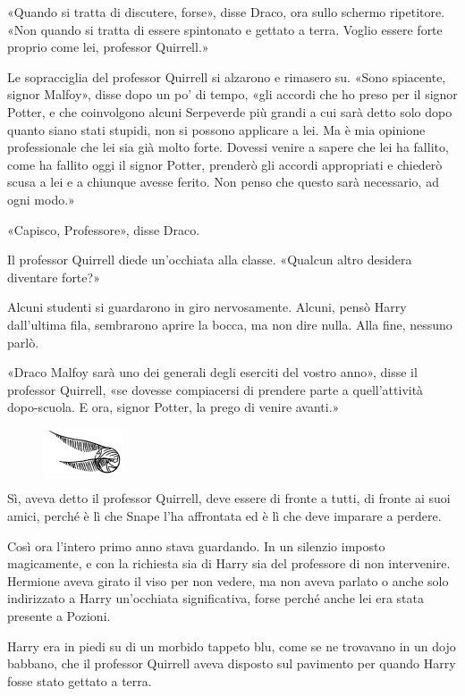 «Quando si tratta di discutere, forse», disse Draco, ora sullo schermo ripetitore. «Non quando si tratta di essere spintonato e gettato a terra. Voglio essere forte proprio come lei, professor Quirrell.»

Le sopracciglia del professor Quirrell si alzarono e rimasero su. «Sono spiacente, signor Malfoy», disse dopo un po’ di tempo, «gli accordi che ho preso per il signor Potter, e che coinvolgono alcuni Serpeverde più grandi a cui sarà detto solo dopo quanto siano stati stupidi, non si possono applicare a lei. Ma è mia opinione professionale che lei sia già molto forte. Dovessi venire a sapere che lei ha fallito, come ha fallito oggi il signor Potter, prenderò gli accordi appropriati e chiederò scusa a lei e a chiunque avesse ferito. Non penso che questo sarà necessario, ad ogni modo.»

«Capisco, Professore», disse Draco.

Il professor Quirrell diede un’occhiata alla classe. «Qualcun altro desidera diventare forte?»

Alcuni studenti si guardarono in giro nervosamente. Alcuni, pensò Harry dall’ultima fila, sembrarono aprire la bocca, ma non dire nulla. Alla fine, nessuno parlò.

«Draco Malfoy sarà uno dei generali degli eserciti del vostro anno», disse il professor Quirrell, «se dovesse compiacersi di prendere parte a quell’attività dopo-scuola. E ora, signor Potter, la prego di venire avanti.»

\begin{figure}[h!]
        \includegraphics[scale=0.4]{boccino.png}
        \centering
\end{figure}

Sì, aveva detto il professor Quirrell, deve essere di fronte a tutti, di fronte ai suoi amici, perché è lì che Snape l’ha affrontata ed è lì che deve imparare a perdere.

Così ora l’intero primo anno stava guardando. In un silenzio imposto magicamente, e con la richiesta sia di Harry sia del professore di non intervenire. Hermione aveva girato il viso per non vedere, ma non aveva parlato o anche solo indirizzato a Harry un’occhiata significativa, forse perché anche lei era stata presente a Pozioni.

Harry era in piedi su di un morbido tappeto blu, come se ne trovavano in un dojo babbano, che il professor Quirrell aveva disposto sul pavimento per quando Harry fosse stato gettato a terra.

